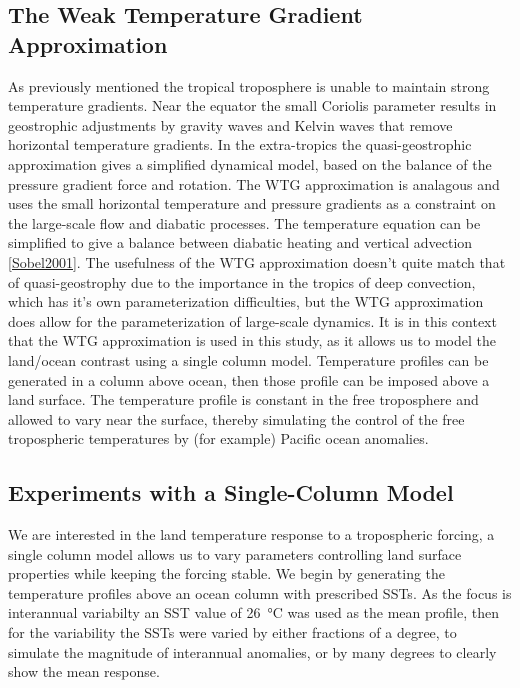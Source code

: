 \subsection{The Weak Temperature Gradient Approximation}
As previously mentioned the tropical troposphere is unable to maintain strong 
temperature gradients. Near the equator the small Coriolis parameter results in 
geostrophic adjustments by gravity waves and Kelvin waves that remove horizontal 
temperature gradients.  In the extra-tropics the quasi-geostrophic approximation 
gives a simplified dynamical model, based on the balance of the pressure 
gradient force and rotation.  The WTG approximation is analagous and uses the 
small horizontal temperature and pressure gradients as a constraint on the 
large-scale flow and diabatic processes. The temperature equation can be 
simplified to give a balance between diabatic heating and vertical advection 
\ref{Sobel2001}. The usefulness of the WTG approximation doesn't quite match 
that of quasi-geostrophy due to the importance in the tropics of deep 
convection, which has it's own parameterization difficulties, but the WTG 
approximation does allow for the parameterization of large-scale dynamics. It is 
in this context that the WTG approximation is used in this study, as it allows 
us to model the land/ocean contrast using a single column model. Temperature 
profiles can be generated in a column above ocean, then those profile can be 
imposed above a land surface. The temperature profile is constant in the free 
troposphere and allowed to vary near the surface, thereby simulating the control 
of the free tropospheric temperatures by (for example) Pacific ocean anomalies.


\subsection{Experiments with a Single-Column Model}
\label{sec:mech_scm}
We are interested in the land temperature response to a tropospheric forcing, a 
single column model allows us to vary parameters controlling land surface 
properties while keeping the forcing stable. We begin by generating the 
temperature profiles above an ocean column with prescribed SSTs. As the focus is 
interannual variabilty an SST value of \SI{26}{\degreeCelsius} was used as the 
mean profile, then for the variability the SSTs were varied by either fractions 
of a degree, to simulate the magnitude of interannual anomalies, or by many 
degrees to clearly show the mean response.

